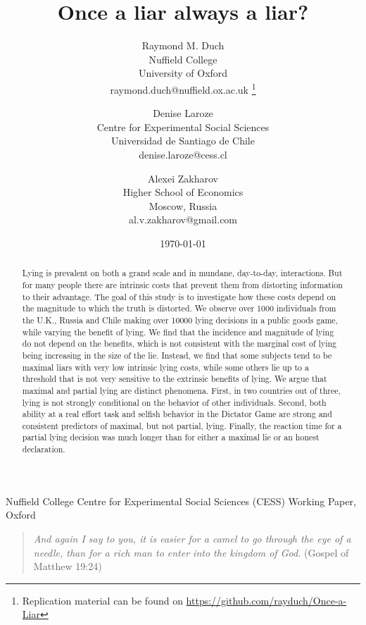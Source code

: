 \documentclass[12pt]{article}
\title{Once a liar always a liar?}
\author{
    Raymond M. Duch\\
    Nuffield College\\
    University of Oxford\\
    raymond.duch@nuffield.ox.ac.uk \thanks{Replication material can be found on \url{https://github.com/rayduch/Once-a-Liar}}
  \and
    Denise Laroze\\
    Centre for Experimental Social Sciences\\
    Universidad de Santiago de Chile \\
    denise.laroze@cess.cl
      \and
    Alexei Zakharov \\
    Higher School of Economics \\
    Moscow, Russia \\
    al.v.zakharov@gmail.com   
\vspace{0.5cm}
}
\date{\today}
\begin{document}
  \maketitle
  \vspace{6cm}
\begin{center}








Nuffield College Centre for Experimental Social Sciences (CESS) Working Paper, Oxford 

\end{center}

\newpage

\begin{abstract}

Lying is prevalent on both a grand scale and in mundane, day-to-day, interactions. But for many people there are intrinsic costs that prevent them from distorting information to their advantage. The goal of this study is to investigate how these costs depend on the magnitude to which the truth is distorted. We observe over 1000 individuals from the U.K., Russia and Chile making over 10000 lying decisions in a public goods game, while varying the benefit of lying. We find that the incidence and magnitude of lying do not depend on the benefits, which is not consistent with the marginal cost of lying being increasing in the size of the lie. Instead, we find that some subjects tend to be maximal liars with very low intrinsic lying costs, while some others lie up to a threshold that is not very sensitive to the extrinsic benefits of lying. We argue that maximal and partial lying are distinct phenomena. First, in two countries out of three, lying is not strongly conditional on the behavior of other individuals. Second, both ability at a real effort task and selfish behavior in the Dictator Game are strong and consistent predictors of maximal, but not partial, lying. Finally, the reaction time for a partial lying decision was much longer than for either a maximal lie or an honest declaration. 

\end{abstract}
\doublespacing

\newpage

\begin{quotation}
{\it And again I say to you, it is easier for a camel to go through the eye of a needle, than for a rich man to enter into the kingdom of God.} (Gospel of Matthew 19:24)
\end{quotation}
\vspace{0.5cm}
\end{document}
